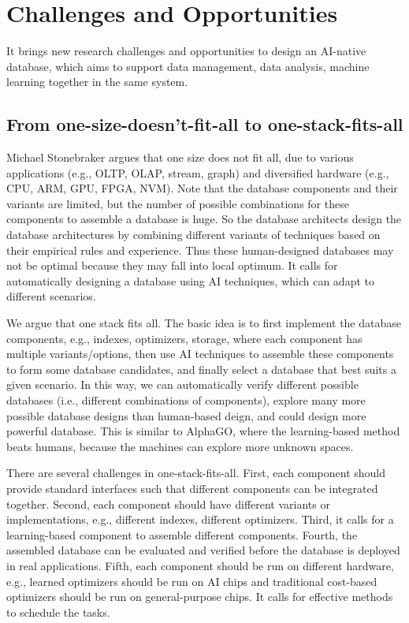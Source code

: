
\section{Challenges and Opportunities}
\label{sec: challenge}

It brings new research challenges and opportunities to design an AI-native database, which aims to support data management, data analysis, machine learning together in the same system.

\subsection{From one-size-doesn't-fit-all to one-stack-fits-all}

Michael Stonebraker argues that one size does not fit all, due to various applications (e.g., OLTP, OLAP, stream, graph) and diversified hardware (e.g., CPU, ARM, GPU, FPGA, NVM). Note that the database components and their variants are limited, but the number of possible combinations for these components to assemble a database is huge. So the database architects design the database architectures by combining different variants of techniques based on their empirical rules and experience. Thus these human-designed databases may not be optimal because they may fall into local optimum. It calls for automatically designing a database using AI techniques, which can adapt to different scenarios. 

We argue that one stack fits all. The basic idea is to first implement the database components, e.g., indexes, optimizers, storage, where each component has multiple variants/options, then use AI techniques to assemble these components to form some database candidates, and finally select a database that best suits a given scenario. In this way, we can automatically verify different possible databases (i.e., different combinations of components), explore many more possible database designs than human-based deign, and could design more powerful database. This is similar to AlphaGO, where the learning-based method beats humans, because the machines can explore more unknown spaces. 


There are several challenges in one-stack-fits-all. First, each component should provide standard interfaces such that different components can be integrated together. Second, each component should have different variants or implementations, e.g., different indexes, different optimizers. Third, it calls for a learning-based component to assemble different components. Fourth, the assembled database can be evaluated and verified before the database is deployed in real applications.  Fifth, each component should be run on different hardware, e.g., learned optimizers should be run on AI chips and traditional cost-based optimizers should be run on general-purpose chips. It calls for effective methods to schedule the tasks. 


